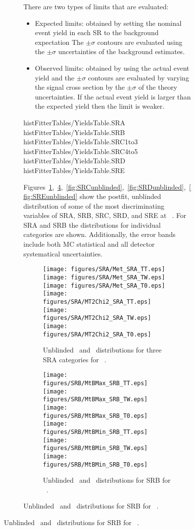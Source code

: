 \begin{figure}[htbp]
\begin{center}
\begin{figure}[htbp]
\begin{center}
{{{There are two types of limits that are evaluated: 

\begin{itemize}
	\item Expected limits: obtained by setting the nominal event yield in each SR to the background expectation The $\pm \sigma$ contours are evaluated using the  $\pm \sigma$ uncertainties of the background estimates.
	\item Observed limits: obtained by using the actual event yield and the $\pm \sigma$ contours are evaluated by varying the signal cross section by the $\pm \sigma$ of the theory uncertainties.  If the actual event yield is larger than the expected yield then the limit is weaker.
\end{itemize}

 {histFitterTables/YieldsTable.SRA}
 {histFitterTables/YieldsTable.SRB}
 {histFitterTables/YieldsTable.SRC1to3}
 {histFitterTables/YieldsTable.SRC4to5}
 {histFitterTables/YieldsTable.SRD}
 {histFitterTables/YieldsTable.SRE}


Figures~\ref{fig:SRAunblinded},~\ref{fig:SRBunblinded},~\ref{fig:SRCunblinded},~\ref{fig:SRDunblinded},~\ref{fig:SREunblinded} show the postfit, unblinded distribution of some of the most discriminating variables of SRA, SRB, SRC, SRD, and SRE at \intlumi\ \ifb. For SRA and SRB the distributions for individual categories are shown. Additionally, the error bands include both MC statistical and all detector systematical uncertainties. 

\begin{figure}[!hp] 
\begin{center}
\texttt{[image: figures/SRA/Met\_SRA\_TT.eps]}
\texttt{[image: figures/SRA/Met\_SRA\_TW.eps]}
\texttt{[image: figures/SRA/Met\_SRA\_T0.eps]}
\texttt{[image: figures/SRA/MT2Chi2\_SRA\_TT.eps]}
\texttt{[image: figures/SRA/MT2Chi2\_SRA\_TW.eps]}
\texttt{[image: figures/SRA/MT2Chi2\_SRA\_T0.eps]}
\caption{Unblinded \met\ and \mttwo\ distributions for three SRA categories for \intlumi\ \ifb.}
\label{fig:SRAunblinded}
\end{center}
\end{figure}

\begin{figure}[!hp] 
\begin{center}
\texttt{[image: figures/SRB/MtBMax\_SRB\_TT.eps]}
\texttt{[image: figures/SRB/MtBMax\_SRB\_TW.eps]}
\texttt{[image: figures/SRB/MtBMax\_SRB\_T0.eps]}
\texttt{[image: figures/SRB/MtBMin\_SRB\_TT.eps]}
\texttt{[image: figures/SRB/MtBMin\_SRB\_TW.eps]}
\texttt{[image: figures/SRB/MtBMin\_SRB\_T0.eps]}
\caption{Unblinded \mtbmax\ and \mtbmin\ distributions for SRB for \intlumi\ \ifb.}
\label{fig:SRBunblinded}
\end{center}
\end{figure}


}}}
\end{center}
\end{figure}
\end{center}
\end{figure}
